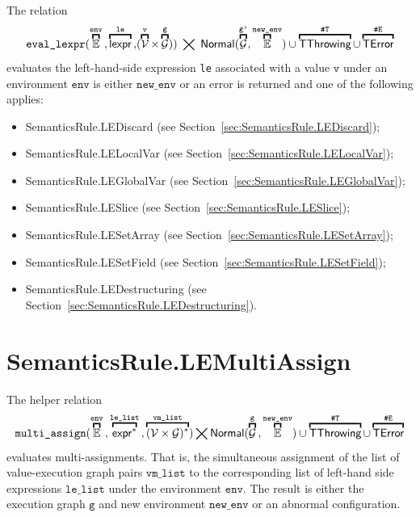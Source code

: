 \documentclass{book}
\newcommand\eqname[0]{\stackrel{\mathsmaller{\mathsf{name}}}{=}}
\newcommand\overname[2]{\overbracket{#1}^{#2}}
\newcommand\xgraph[0]{\textsf{g}}
\newcommand\emptygraph[0]{{\emptyset}_\xgraph}
\newcommand\XGraphs[0]{\mathcal{G}}
\newcommand\vals[0]{\mathcal{V}}
\newcommand\ordered[3]{{#1}\xrightarrow{#2}{#3}}
\newcommand\evalarrow[0]{\stackrel{\mathsf{asl}}{\rightsquigarrow}}
\newcommand\aslrel[0]{\bigtimes}
\newcommand\aslsep[0]{\mathbf{,}}
\newcommand\sslash[0]{\mathbin{/\mkern-6mu/}}
\newcommand\terminateas[0]{\;\sslash\;}
\newcommand\ThrowingConfig[0]{\texttt{\#T}}
\newcommand\ErrorConfig[0]{\texttt{\#E}}
\newcommand\OrAbnormal[0]{\terminateas \ThrowingConfig, \ErrorConfig}
\newcommand\TError[0]{\textsf{TError}}
\newcommand\TThrowing[0]{\textsf{TThrowing}}
\newcommand\evallexpr[1]{\texttt{eval\_lexpr}(#1)}
\newcommand\evalmultiassignment[1]{\texttt{multi\_assign}(#1)}
\newcommand\Normal[0]{\textsf{Normal}}
\newcommand\newenv[0]{\texttt{new\_env}}
\newcommand\env[0]{\texttt{env}}
\newcommand\envp[0]{\texttt{env'}}
\newcommand\vg[0]{\texttt{g}}
\newcommand\vgp[0]{\texttt{g'}}
\newcommand\vm[0]{\texttt{m}}
\newcommand\vv[0]{\texttt{v}}
\newcommand\vle[0]{\texttt{le}}
\newcommand\vgone[0]{\texttt{g1}}
\newcommand\vgtwo[0]{\texttt{g2}}
\newcommand\vlelist[0]{\texttt{le\_list}}
\newcommand\vmlist[0]{\texttt{vm\_list}}
\begin{document}
The relation
\[
  \evallexpr{\overname{\envs}{\env} \aslsep \overname{\lexpr}{\vle} \aslsep (\overname{\vals}{\vv} \times \overname{\XGraphs}{\vg})} \;\aslrel\;
    \Normal(\overname{\XGraphs}{\vgp},\overname{\envs}{\newenv}) \cup
    \overname{\TThrowing}{\ThrowingConfig} \cup \overname{\TError}{\ErrorConfig}
\]
evaluates the left-hand-side expression \texttt{le} associated with a
value $\vv$ under an environment $\env$ is either $\newenv$
or an error is returned and one of the following applies:
\begin{itemize}
\item SemanticsRule.LEDiscard (see Section~\ref{sec:SemanticsRule.LEDiscard});
\item SemanticsRule.LELocalVar (see Section~\ref{sec:SemanticsRule.LELocalVar});
\item SemanticsRule.LEGlobalVar (see Section~\ref{sec:SemanticsRule.LEGlobalVar});
\item SemanticsRule.LESlice (see Section~\ref{sec:SemanticsRule.LESlice});
\item SemanticsRule.LESetArray (see Section~\ref{sec:SemanticsRule.LESetArray});
\item SemanticsRule.LESetField (see Section~\ref{sec:SemanticsRule.LESetField});
\item SemanticsRule.LEDestructuring (see Section~\ref{sec:SemanticsRule.LEDestructuring}).
\end{itemize}

\section{SemanticsRule.LEMultiAssign \label{sec:SemanticsRuleLEMultiAssign}}
The helper relation
\[
  \evalmultiassignment{\overname{\envs}{\env} \aslsep \overname{\expr^*}{\vlelist} \aslsep \overname{(\vals \times \XGraphs)^*}{\vmlist}} \aslrel
  \Normal(\overname{\XGraphs}{\vg} \aslsep \overname{\envs}{\newenv}) \cup
  \overname{\TThrowing}{\ThrowingConfig} \cup \overname{\TError}{\ErrorConfig}
\]
evaluates multi-assignments.
That is, the simultaneous assignment of the list of value-execution graph pairs $\vmlist$
to the corresponding list of left-hand side expressions $\vlelist$ under the environment $\env$.
The result is either the execution graph $\vg$ and new environment $\newenv$ or an abnormal configuration.

\end{document}
